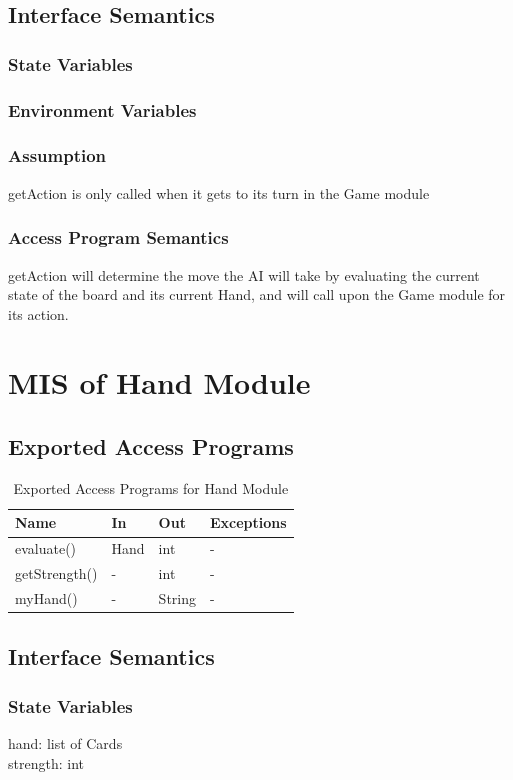 \documentclass[11pt]{article}
\begin{document}
    \subsection{Interface Semantics}
    \subsubsection{State Variables}
    \subsubsection{Environment Variables}
    \subsubsection{Assumption}
    getAction is only called when it gets to its turn in the Game module
    \subsubsection{Access Program Semantics}
    getAction will determine the move the AI will take by evaluating the current state of the board and its current Hand, and will call upon the Game module for its action. 
    \newline
    \section{MIS of Hand Module}
    \subsection{Exported Access Programs}
    \begin{table}[h]
    \caption{Exported Access Programs for Hand Module}
    \begin{tabular}{p{4cm}p{2cm}p{2cm}p{4cm}}
    Name & In & Out & Exceptions\\
    \hline
    evaluate() & Hand & int & -\\
    \hline
    getStrength() & - & int & -\\
    \hline
    myHand() & - & String & - \\
    \hline
    \end{tabular}
    \end{table}
    \subsection{Interface Semantics}
    \subsubsection{State Variables}
    hand: list of Cards\\
    strength: int
\end{document}
